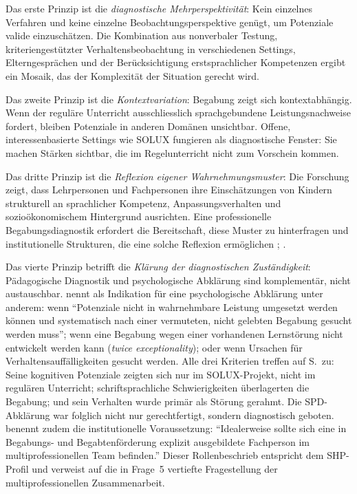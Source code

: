 \documentclass[ngerman, a4paper]{article}
\begin{document}
Das erste Prinzip ist die \textit{diagnostische Mehrperspektivität}: Kein einzelnes
Verfahren und keine einzelne Beobachtungsperspektive genügt, um Potenziale valide
einzuschätzen. Die Kombination aus nonverbaler Testung, kriteriengestützter
Verhaltensbeobachtung in verschiedenen Settings, Elterngesprächen und der
Berücksichtigung erstsprachlicher Kompetenzen ergibt ein Mosaik, das der Komplexität
der Situation gerecht wird.

Das zweite Prinzip ist die \textit{Kontextvariation}: Begabung zeigt sich
kontextabhängig. Wenn der reguläre Unterricht ausschliesslich sprachgebundene
Leistungsnachweise fordert, bleiben Potenziale in anderen Domänen unsichtbar.
Offene, interessenbasierte Settings wie SOLUX fungieren als diagnostische Fenster: Sie
machen Stärken sichtbar, die im Regelunterricht nicht zum Vorschein kommen.

Das dritte Prinzip ist die \textit{Reflexion eigener Wahrnehmungsmuster}: Die
Forschung zeigt, dass Lehrpersonen und Fachpersonen ihre Einschätzungen von Kindern
strukturell an sprachlicher Kompetenz, Anpassungsverhalten und sozioökonomischem
Hintergrund ausrichten. Eine professionelle Begabungsdiagnostik erfordert die
Bereitschaft, diese Muster zu hinterfragen und institutionelle Strukturen, die eine
solche Reflexion ermöglichen
\parencite[S.\,576--585]{stamm2021fehlenderblick};
\parencite[S.\,161,\,163\psq]{macha2019gender}.

Das vierte Prinzip betrifft die \textit{Klärung der diagnostischen
Zuständigkeit}: Pädagogische Diagnostik und psychologische Abklärung
sind komplementär, nicht austauschbar.
\textcite[S.\,235--236]{muelleroppliger2021paeddiagnostik} nennt als
Indikation für eine psychologische Abklärung unter anderem: wenn
\enquote{Potenziale nicht in wahrnehmbare Leistung umgesetzt werden
können und systematisch nach einer vermuteten, nicht gelebten Begabung
gesucht werden muss}; wenn eine Begabung wegen einer vorhandenen
Lernstörung nicht entwickelt werden kann (\textit{twice exceptionality});
oder wenn Ursachen für Verhaltensauffälligkeiten gesucht werden. Alle
drei Kriterien treffen auf S.\ zu: Seine kognitiven Potenziale zeigten
sich nur im SOLUX-Projekt, nicht im regulären Unterricht;
schriftsprachliche Schwierigkeiten überlagerten die Begabung; und sein
Verhalten wurde primär als Störung gerahmt. Die SPD-Abklärung war
folglich nicht nur gerechtfertigt, sondern diagnostisch geboten.
\textcite[S.\,230]{muelleroppliger2021paeddiagnostik} benennt zudem die
institutionelle Voraussetzung: \enquote{Idealerweise sollte sich eine in
Begabungs- und Begabtenförderung explizit ausgebildete Fachperson im
multiprofessionellen Team befinden.} Dieser Rollenbeschrieb entspricht
dem SHP-Profil und verweist auf die in Frage~5 vertiefte Fragestellung
der multiprofessionellen Zusammenarbeit.
 
\end{document}
